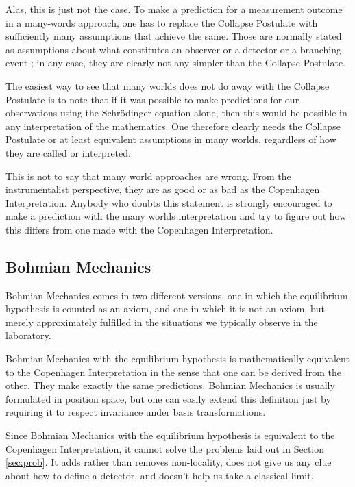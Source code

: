 \documentclass[superscriptaddress,floatfix,nofootinbib,12pt]{revtex4-2}
\begin{document}
Alas, this is just not the case. To make a prediction for a measurement outcome in a many-words approach, one has to replace the Collapse Postulate with sufficiently many assumptions that achieve the same. Those are normally stated as assumptions about what constitutes an observer or a detector or a branching event \cite{Sebens2018OriginsEverettCarroll}; in any case, they are clearly not any simpler than the Collapse Postulate. 

The easiest way to see that many worlds does not do away with the Collapse Postulate is to note that if it was possible to make predictions for our observations using the Schr\"odinger equation alone, then this would be possible in any interpretation of the mathematics. One therefore clearly needs the Collapse Postulate or at least equivalent assumptions in many worlds, regardless of how they are called or interpreted. 
 
This is not to say that many world approaches are wrong. From the instrumentalist perspective, they are as good or as bad as the Copenhagen Interpretation. Anybody who doubts this statement is strongly encouraged to make a prediction with the many worlds interpretation and try to figure out how this differs from one made with the Copenhagen Interpretation. 
 
\subsection{Bohmian Mechanics}

Bohmian Mechanics \cite{Bohm1952Bohm1,Bohm1952Bohm2} comes in two different versions, one in which the equilibrium hypothesis is counted as an axiom, and one in which it is not an axiom, but merely approximately fulfilled in the situations we typically observe in the laboratory.

Bohmian Mechanics with the equilibrium hypothesis is mathematically equivalent to the Copenhagen Interpretation in the sense that one can be derived from the other. They make exactly the same predictions. Bohmian Mechanics is usually formulated in position space, but one can easily extend this definition just by requiring it to respect invariance under basis transformations.

Since Bohmian Mechanics with the equilibrium hypothesis is equivalent to the Copenhagen Interpretation, it cannot solve the problems laid out in Section \ref{sec:prob}. It adds rather than removes non-locality, does not give us any clue about how to define a detector, and doesn't help us take a classical limit. 
\end{document}
